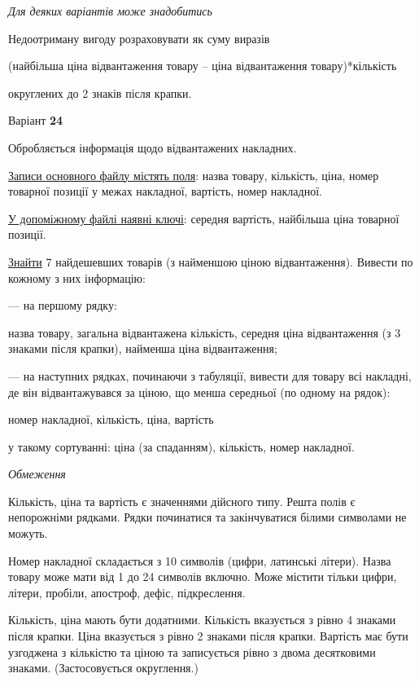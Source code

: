 \documentclass[11pt, ukrainian]{article}
\begin{document}
\bigskip\textit{Для деяких варіантів може знадобитись}

Недоотриману вигоду розраховувати як суму виразів
{\center (найбільша ціна відвантаження товару – ціна відвантаження товару)*кількість\par}

\bigskip
{\noindent} округлених до 2 знаків після крапки.


\par
\newpage
{\center Варіант  \No \textbf { 24 }\par}
\bigskip
Обробляється інформація щодо відвантажених накладних.

\underline{Записи основного файлу містять поля}: назва товару, кількість, ціна, номер товарної позиції у межах накладної, вартість, номер накладної.

\underline{У допоміжному файлі наявні ключі}: середня вартість, найбільша ціна товарної позиції.

\underline{Знайти} 7 найдешевших товарів (з найменшою ціною відвантаження). Вивести по кожному з них інформацію:\par
{\noindent}--- на першому рядку:\par
назва товару, загальна відвантажена кількість, середня ціна відвантаження (з 3 знаками після крапки), найменша ціна відвантаження;

{\noindent}--- на наступних рядках, починаючи з табуляції, вивести для товару всі накладні, де він відвантажувався за ціною, що менша середньої (по одному на рядок):\par
номер накладної, кількість, ціна, вартість

{\noindent}у такому сортуванні: ціна (за спаданням), кількість, номер накладної.


\bigskip\textit{Обмеження}

Кількість, ціна та вартість є значеннями дійсного типу.
Решта полів є непорожніми рядками.
Рядки починатися та закінчуватися білими символами не можуть.

Номер накладної складається з 10 символів (цифри, латинські літери).
Назва товару може мати від 1 до 24 символів включно.
Може містити тільки цифри, літери, пробіли, апостроф, дефіс, підкреслення.

Кількість, ціна мають бути додатними.
Кількість вказується з рівно 4 знаками після крапки.
Ціна вказується з рівно 2 знаками після крапки.
Вартість має бути узгоджена з кількістю та ціною та записується рівно з двома десятковими знаками.
(Застосовується округлення.)
\end{document}
